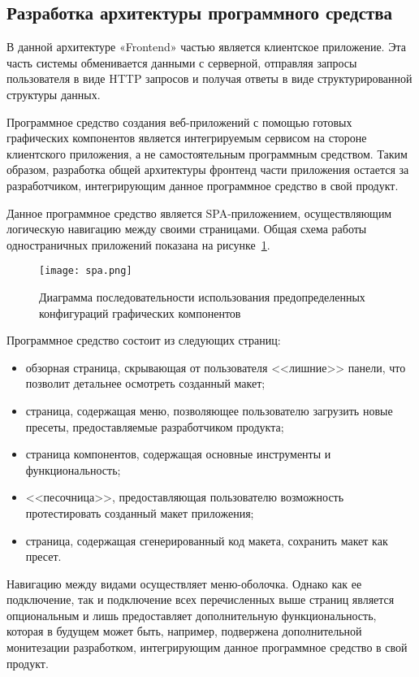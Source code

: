 \subsection{Разработка архитектуры программного средства}
\label{sec:modeling:sequence_diagram}

В данной архитектуре «Frontend» частью является клиентское приложение. Эта часть системы обменивается данными с серверной, отправляя запросы пользователя в виде HTTP запросов и получая ответы в виде структурированной структуры данных. 

Программное средство создания веб-приложений с помощью готовых графических компонентов является интегрируемым сервисом на стороне клиентского приложения, а не самостоятельным программным средством. Таким образом, разработка общей архитектуры фронтенд части приложения остается за разработчиком, интегрирующим данное программное средство в свой продукт.

Данное программное средство является SPA-приложением, осуществляющим логическую навигацию между своими страницами. Общая схема работы одностраничных приложений показана на рисунке~\ref{sec:design:spa}.\pagebreak
\begin{figure}[ht]
\centering
    \texttt{[image: spa.png]}
    \caption{Диаграмма последовательности использования предопределенных конфигураций графических компонентов}
    \label{sec:design:spa}
\end{figure}

Программное средство состоит из следующих страниц:

\begin{itemize}
    \item обзорная страница, скрывающая от пользователя <<лишние>> панели, что позволит детальнее осмотреть созданный макет;
    \item страница, содержащая меню, позволяющее пользователю загрузить новые пресеты, предоставляемые разработчиком продукта;
    \item страница компонентов, содержащая основные инструменты и функциональность;
    \item <<песочница>>, предоставляющая пользователю возможность протестировать созданный макет приложения;
    \item страница, содержащая сгенерированный код макета, сохранить макет как пресет.
\end{itemize}

Навигацию между видами осуществляет меню-оболочка. Однако как ее подключение, так и подключение всех перечисленных выше страниц является опциональным и лишь предоставляет дополнительную функциональность, которая в будущем может быть, например, подвержена дополнительной монитезации разработком, интегрирующим данное программное средство в свой продукт.

